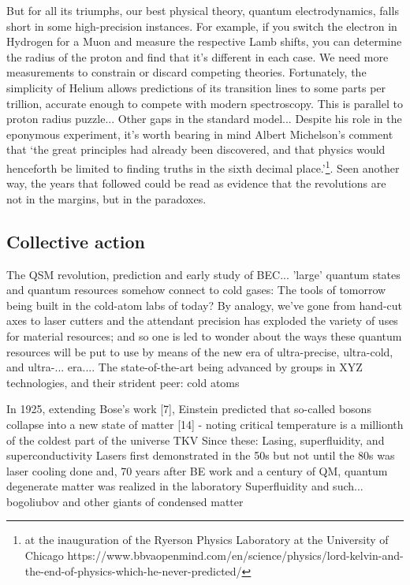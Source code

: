 	But for all its triumphs, our best physical theory, quantum electrodynamics, falls short in some high-precision instances.
	For example, if you switch the electron in Hydrogen for a Muon and measure the respective Lamb shifts, you can determine the radius of the proton and find that it's different in each case.
	We need more measurements to constrain or discard competing theories.
	Fortunately, the simplicity of Helium allows predictions of its transition lines to some parts per trillion, accurate enough to compete with modern spectroscopy.
	This is parallel to proton radius puzzle... Other gaps in the standard model...
	Despite his role in the eponymous experiment, it's worth bearing in mind Albert Michelson's comment that `the great principles had already been discovered, and that physics would henceforth be limited to finding truths in the sixth decimal place.'\footnote{ at the inauguration of the Ryerson Physics Laboratory at the University of Chicago https://www.bbvaopenmind.com/en/science/physics/lord-kelvin-and-the-end-of-physics-which-he-never-predicted/}.
	Seen another way, the years that followed could be read as evidence that the revolutions are not in the margins, but in the paradoxes.

\subsection*{Collective action}
	The QSM revolution, prediction and early study of BEC... 
		'large' quantum states and quantum resources
		somehow connect to cold gases: The tools of tomorrow being built in the cold-atom labs of today? By analogy, we've gone from hand-cut axes to laser cutters and the attendant precision has exploded the variety of uses for material resources; and so one is led to wonder about the ways these quantum resources will be put to use by means of the new era of ultra-precise, ultra-cold, and ultra-... era.... The state-of-the-art being advanced by groups in XYZ technologies, and their strident peer: cold atoms

	In 1925, extending Bose's work [7], Einstein predicted that so-called bosons collapse into a new state of matter [14] - noting critical temperature is a millionth of the coldest part of the universe TKV
	Since these: Lasing, superfluidity, and superconductivity 
	Lasers first demonstrated in the 50s but not until the 80s was laser cooling done and, 70 years after BE work and a century of QM, quantum degenerate matter was realized in the laboratory
	Superfluidity and such... bogoliubov and other giants of condensed matter

